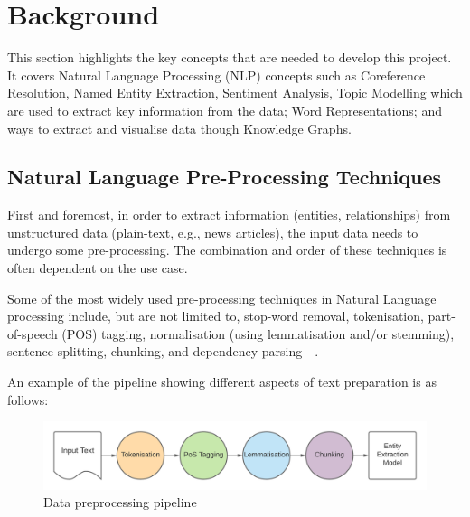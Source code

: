 \chapter{Background}

This section highlights the key concepts that are needed to develop this project. It covers Natural Language Processing (NLP) concepts such as Coreference Resolution, Named Entity Extraction, Sentiment Analysis, Topic Modelling which are used to extract key information from the data; Word Representations; and ways to extract and visualise data though Knowledge Graphs.


\section{Natural Language Pre-Processing Techniques}

First and foremost, in order to extract information (entities, relationships) from unstructured data (plain-text, e.g., news articles), the input data needs to undergo some pre-processing. The combination and order of these techniques is often dependent on the use case.

Some of the most widely used pre-processing techniques in Natural Language processing include, but are not limited to, stop-word removal, tokenisation, part-of-speech (POS) tagging, normalisation (using lemmatisation and/or stemming), sentence splitting, chunking, and dependency parsing~\cite{kannan2014preprocessing}~\cite{ieee_named_entity}.

An example of the pipeline showing different aspects of text preparation is as follows:

\begin{figure}[H]
\centering
\includegraphics[scale=0.15]{images/sentence chaining}
\caption{Data preprocessing pipeline}
\end{figure}

